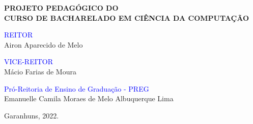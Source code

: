 \begin{center}
    {\bfseries PROJETO PEDAGÓGICO DO\\
    CURSO DE BACHARELADO EM CIÊNCIA DA COMPUTAÇÃO}
    
    \vspace*{36pt}
    
    \textcolor{blue}{\sffamily REITOR}\\
    Airon Aparecido de Melo
    
    \textcolor{blue}{\sffamily VICE-REITOR}\\
    Mácio Farias de Moura
    
    \textcolor{blue}{\sffamily Pró-Reitoria de Ensino de Graduação - PREG}\\
    Emanuelle Camila Moraes de Melo Albuquerque Lima
    
    
    
    
    
    
    \vspace*{\fill}
    
    Garanhuns, 2022.
\end{center}

\newpage
